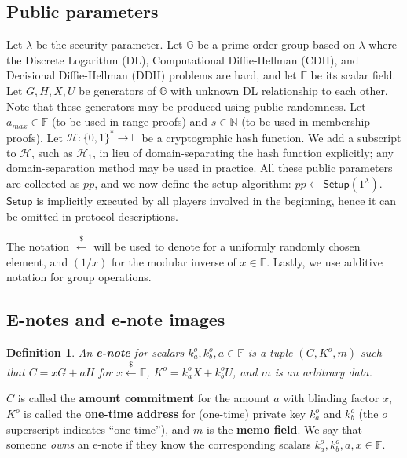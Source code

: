 \documentclass{article}
\newtheorem{definition}{Definition}[section]
\begin{document}
\subsection{Public parameters}
Let $\lambda$ be the security parameter. Let $\mathbb{G}$ be a prime order group based on $\lambda$ where the Discrete Logarithm (DL), Computational Diffie-Hellman (CDH), and Decisional Diffie-Hellman (DDH) problems are hard, and let $\mathbb{F}$ be its scalar field. Let $G, H, X, U$ be generators of $\mathbb{G}$ with unknown DL relationship to each other. Note that these generators may be produced using public randomness. Let $a_{max}\in\mathbb{F}$ (to be used in range proofs) and $s\in\mathbb{N}$ (to be used in membership proofs). Let $\mathcal{H}:\{0,1\}^*\rightarrow\mathbb{F}$ be a cryptographic hash function. We add a subscript to $\mathcal{H}$, such as $\mathcal{H}_1$, in lieu of domain-separating the hash function explicitly; any domain-separation method may be used in practice. All these public parameters are collected as $pp$, and we now define the setup algorithm: $pp\leftarrow\textsf{Setup}(1^{\lambda})$. $\textsf{Setup}$ is implicitly executed by all players involved in the beginning, hence it can be omitted in protocol descriptions.

The notation $\xleftarrow{\$}$ will be used to denote for a uniformly randomly chosen element, and $(1/x)$ for the modular inverse of $x\in\mathbb{F}$. Lastly, we use additive notation for group operations.

\subsection{E-notes and e-note images}
\begin{definition}\label{e-note}
An \textbf{\em e-note} for scalars $k_a^o, k_b^o, a \in\mathbb{F}$ is a tuple $(C, K^o, m)$ such that $C = x G + a H$ for $x\xleftarrow{\$}\mathbb{F}$, $K^o=k_a^o X + k_b^o U$, and $m$ is an arbitrary data.
\end{definition}
$C$ is called the \textbf{amount commitment} for the amount $a$ with blinding factor $x$, $K^o$ is called the \textbf{one-time address} for (one-time) private key $k_a^o$ and $k_b^o$ (the $o$ superscript indicates ``one-time''), and $m$ is the \textbf{memo field}. We say that someone \textit{owns} an e-note if they know the corresponding scalars $k_a^o, k_b^o, a, x \in\mathbb{F}$.
\end{document}
